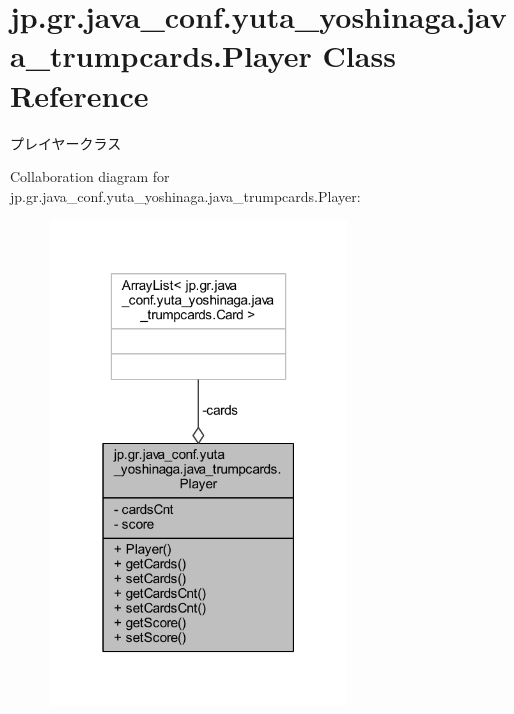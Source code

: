 \hypertarget{classjp_1_1gr_1_1java__conf_1_1yuta__yoshinaga_1_1java__trumpcards_1_1_player}{}\section{jp.\+gr.\+java\+\_\+conf.\+yuta\+\_\+yoshinaga.\+java\+\_\+trumpcards.\+Player Class Reference}
\label{classjp_1_1gr_1_1java__conf_1_1yuta__yoshinaga_1_1java__trumpcards_1_1_player}


プレイヤークラス  




Collaboration diagram for jp.\+gr.\+java\+\_\+conf.\+yuta\+\_\+yoshinaga.\+java\+\_\+trumpcards.\+Player\+:
\nopagebreak
\begin{figure}[H]
\begin{center}
\leavevmode
\includegraphics[width=223pt]{classjp_1_1gr_1_1java__conf_1_1yuta__yoshinaga_1_1java__trumpcards_1_1_player__coll__graph}
\end{center}
\end{figure}

